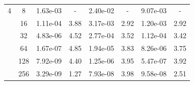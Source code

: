 \begin{table}[htbp]
\begin{center}
\begin{tabular}{| c | c | c c | c c | c c |}
			\hline

			4	& 8 & 1.63e-03 & - & 2.40e-02 & - & 9.07e-03 & - \\
			& 16 & 1.11e-04 & 3.88 & 3.17e-03 & 2.92 & 1.20e-03 & 2.92 \\
			& 32 & 4.83e-06 & 4.52 & 2.77e-04 & 3.52 & 1.12e-04 & 3.42 \\
			& 64 & 1.67e-07 & 4.85 & 1.94e-05 & 3.83 & 8.26e-06 & 3.75 \\
			& 128 & 7.92e-09 & 4.40 & 1.25e-06 & 3.95 & 5.47e-07 & 3.92 \\
			& 256 & 3.29e-09 & 1.27 & 7.93e-08 & 3.98 & 9.58e-08 & 2.51 \\

			\hline
		\end{tabular}
	\end{center}
\end{table}


